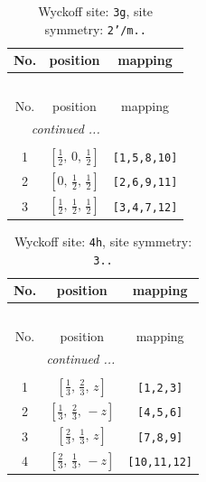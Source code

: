 \documentclass[fleqn,8pt]{jsarticle}
\begin{document}
\begin{longtable}{ccc}
\caption{Wyckoff site: {\tt 3g}, site symmetry: {\tt 2'/m..}}
 \\
 \hline \hline
No. & position & mapping \\ \hline \endfirsthead

\multicolumn{2}{l}{\tablename\ \thetable{}} \\
 \hline \hline
No. & position & mapping \\ \hline \endhead

 \hline \hline
\multicolumn{2}{r}{\footnotesize\it continued ...} \\ \endfoot

 \hline \hline
\multicolumn{2}{r}{} \\ \endlastfoot

1 & $\left[ \frac{1}{2},\, 0,\, \frac{1}{2} \right]$ & {\tt [1,5,8,10]} \\ \hline
2 & $\left[ 0,\, \frac{1}{2},\, \frac{1}{2} \right]$ & {\tt [2,6,9,11]} \\ \hline
3 & $\left[ \frac{1}{2},\, \frac{1}{2},\, \frac{1}{2} \right]$ & {\tt [3,4,7,12]} \\
\end{longtable}
\renewcommand{\arraystretch}{1.2}
\begin{longtable}{ccc}
\caption{Wyckoff site: {\tt 4h}, site symmetry: {\tt 3..}}
 \\
 \hline \hline
No. & position & mapping \\ \hline \endfirsthead

\multicolumn{2}{l}{\tablename\ \thetable{}} \\
 \hline \hline
No. & position & mapping \\ \hline \endhead

 \hline \hline
\multicolumn{2}{r}{\footnotesize\it continued ...} \\ \endfoot

 \hline \hline
\multicolumn{2}{r}{} \\ \endlastfoot

1 & $\left[ \frac{1}{3},\, \frac{2}{3},\, z \right]$ & {\tt [1,2,3]} \\ \hline
2 & $\left[ \frac{1}{3},\, \frac{2}{3},\, - z \right]$ & {\tt [4,5,6]} \\ \hline
3 & $\left[ \frac{2}{3},\, \frac{1}{3},\, z \right]$ & {\tt [7,8,9]} \\ \hline
4 & $\left[ \frac{2}{3},\, \frac{1}{3},\, - z \right]$ & {\tt [10,11,12]} \\
\end{longtable}
\end{document}
